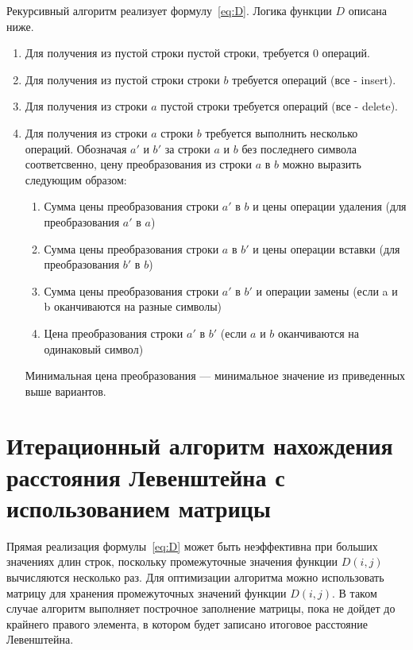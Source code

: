 \documentclass[12pt]{report}
\begin{document}
    Рекурсивный алгоритм реализует формулу~\ref{eq:D}.
    Логика функции $D$ описана ниже.
    \begin{enumerate}
        \item Для получения из пустой строки пустой строки, требуется 0 операций.
        \item Для получения из пустой строки строки $b$ требуется  операций (все - insert).
        \item Для получения из строки $a$ пустой строки требуется  операций (все - delete).
        \item Для получения из строки $a$ строки $b$ требуется выполнить несколько операций.
        Обозначая $a'$ и $b'$ за строки $a$ и $b$ без последнего символа соответсвенно, цену преобразования
        из строки $a$ в $b$ можно выразить следующим образом:
        \begin{enumerate}
            \item Сумма цены преобразования строки $a'$ в $b$ и цены операции удаления (для преобразования $a'$ в $a$)
            \item Сумма цены преобразования строки $a$ в $b'$ и цены операции вставки (для преобразования $b'$ в $b$)
            \item Сумма цены преобразования строки $a'$ в $b'$ и операции замены
            (если a и b оканчиваются на разные символы)
            \item Цена преобразования строки $a'$ в $b'$ (если $a$ и $b$ оканчиваются на одинаковый символ)
        \end{enumerate}
        Минимальная цена преобразования --- минимальное значение из приведенных выше вариантов.
    \end{enumerate}


    \section{Итерационный алгоритм нахождения расстояния Левенштейна с использованием матрицы}
    Прямая реализация формулы~\ref{eq:D} может быть неэффективна при больших значениях длин строк,
    поскольку промежуточные значения функции $D(i, j)$ вычисляются несколько раз.
    Для оптимизации алгоритма можно использовать матрицу для хранения промежуточных значений функции $D(i, j)$.
    В таком случае алгоритм выполняет построчное заполнение матрицы, пока не дойдет до крайнего правого элемента,
    в котором будет записано итоговое расстояние Левенштейна.
\end{document}

